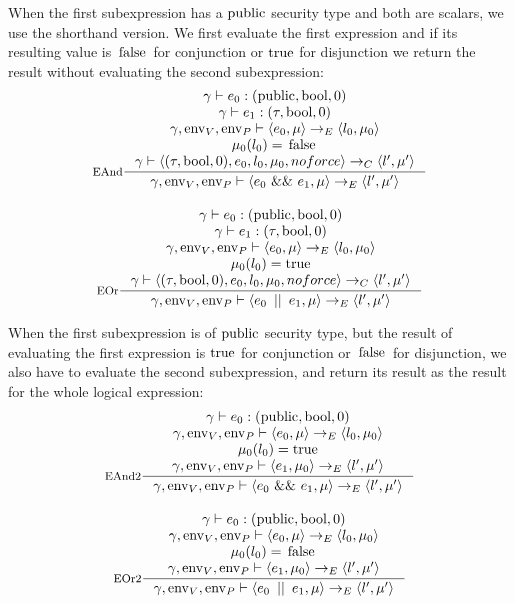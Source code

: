 \documentclass[a4paper, 10pt, draft]{report}
\DeclareMathOperator*{\env}{env}
\newcommand{\mycode}[1]{\ensuremath{\mbox{\lstinline{#1}}}}
\begin{document}
When the first subexpression has a \mycode{public} security type and both are
scalars, we use the shorthand version. We first evaluate the first expression
and if its resulting value is \mycode{false} for conjunction or \mycode{true}
for disjunction we return the result without evaluating the second
subexpression:
\[\begin{array}{c}
\inference[EAnd]{
  \gamma |- e_0 : (\mycode{public}, \mycode{bool}, 0) \\
  \gamma |- e_1 : (\tau, \mycode{bool}, 0) \\
  \gamma, \env_V, \env_P |- \left<e_0, \mu \right> \to_E \left< l_0, \mu_0 \right> \\
  \mu_0(l_0) = \mycode{false} \\
  \gamma |- \left<  (\tau, \mycode{bool}, 0), e_0, l_0, \mu_0, noforce \right> \to_C \left<l', \mu' \right>
}{
  \gamma, \env_V, \env_P |- \left<e_0\ \mycode{&&}\ e_1, \mu \right> \to_E \left<l', \mu' \right>
} \\[2em]
\inference[EOr]{
  \gamma |- e_0 : (\mycode{public}, \mycode{bool}, 0) \\
  \gamma |- e_1 : (\tau, \mycode{bool}, 0) \\
  \gamma, \env_V, \env_P |- \left<e_0, \mu \right> \to_E \left< l_0, \mu_0 \right> \\
  \mu_0(l_0) = \mycode{true} \\
  \gamma |- \left< (\tau, \mycode{bool}, 0), e_0, l_0, \mu_0, noforce \right> \to_C \left<l', \mu' \right>
}{
  \gamma, \env_V, \env_P |- \left<e_0\ \mycode{||}\ e_1, \mu \right> \to_E \left<l', \mu' \right>
}
\end{array}\]

When the first subexpression is of \mycode{public} security type, but the
result of evaluating the first expression is \mycode{true} for conjunction or
\mycode{false} for disjunction, we also have to evaluate the second
subexpression, and return its result as the result for the whole logical
expression:
\[
\begin{array}{c}
\inference[EAnd2]{
  \gamma |- e_0 : (\mycode{public}, \mycode{bool}, 0) \\
  \gamma, \env_V, \env_P |- \left<e_0, \mu \right> \to_E \left< l_0, \mu_0 \right> \\
  \mu_0(l_0) = \mycode{true} \\
  \gamma, \env_V, \env_P |- \left<e_1, \mu_0 \right> \to_E \left< l', \mu' \right> \\
}{
  \gamma, \env_V, \env_P |- \left<e_0\ \mycode{&&}\ e_1, \mu \right> \to_E \left<l', \mu' \right>
} \\[2em]
\inference[EOr2]{
  \gamma |- e_0 : (\mycode{public}, \mycode{bool}, 0) \\
  \gamma, \env_V, \env_P |- \left<e_0, \mu \right> \to_E \left< l_0, \mu_0 \right> \\
  \mu_0(l_0) = \mycode{false} \\
  \gamma, \env_V, \env_P |- \left<e_1, \mu_0 \right> \to_E \left< l', \mu' \right> \\
}{
  \gamma, \env_V, \env_P |- \left<e_0\ \mycode{||}\ e_1, \mu \right> \to_E \left<l', \mu' \right>
}
\end{array}\]
\end{document}
